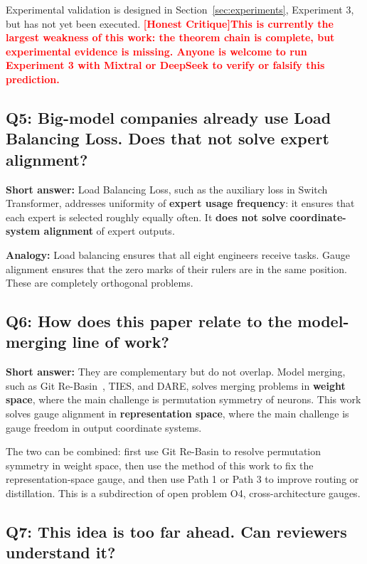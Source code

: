 \documentclass[12pt,a4paper]{article}
\theoremstyle{remark}
\newcommand{\honestcrit}[1]{%
    \textcolor{red}{\textbf{[Honest Critique]#1}}%
}
\begin{document}
Experimental validation is designed in Section~\ref{sec:experiments}, Experiment 3, but has not yet been executed. \honestcrit{This is currently the largest weakness of this work: the theorem chain is complete, but experimental evidence is missing. Anyone is welcome to run Experiment 3 with Mixtral or DeepSeek to verify or falsify this prediction.}

\subsection*{Q5: Big-model companies already use Load Balancing Loss. Does that not solve expert alignment?}

\textbf{Short answer:} Load Balancing Loss, such as the auxiliary loss in Switch Transformer, addresses uniformity of \textbf{expert usage frequency}: it ensures that each expert is selected roughly equally often. It \textbf{does not solve} \textbf{coordinate-system alignment} of expert outputs.

\textbf{Analogy:} Load balancing ensures that all eight engineers receive tasks. Gauge alignment ensures that the zero marks of their rulers are in the same position. These are completely orthogonal problems.

\subsection*{Q6: How does this paper relate to the model-merging line of work?}

\textbf{Short answer:} They are complementary but do not overlap. Model merging, such as Git Re-Basin~\cite{ainsworth2023}, TIES, and DARE, solves merging problems in \textbf{weight space}, where the main challenge is permutation symmetry of neurons. This work solves gauge alignment in \textbf{representation space}, where the main challenge is gauge freedom in output coordinate systems.

The two can be combined: first use Git Re-Basin to resolve permutation symmetry in weight space, then use the method of this work to fix the representation-space gauge, and then use Path 1 or Path 3 to improve routing or distillation. This is a subdirection of open problem O4, cross-architecture gauges.

\subsection*{Q7: This idea is too far ahead. Can reviewers understand it?}
\end{document}

